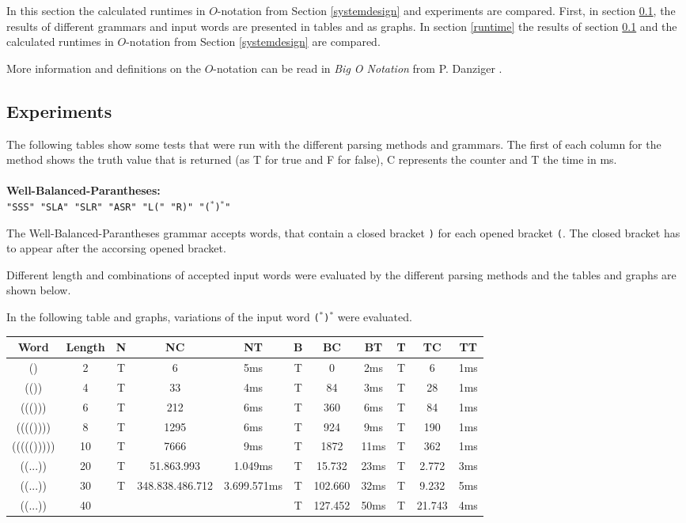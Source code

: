 \documentclass[a4paper, 11pt]{article}
\begin{document}
In this section the calculated runtimes in $O$-notation from Section \ref{systemdesign} and experiments are compared. 
First, in section \ref{experiments}, the results of different grammars and input words are presented in tables and as graphs.
In section \ref{runtime} the results of section \ref{experiments} and the calculated runtimes in $O$-notation from Section \ref{systemdesign} are compared.

More information and definitions on the $O$-notation can be read in \textit{Big O Notation} from P. Danziger \cite{bigO}.


\subsection{Experiments}
\label{experiments}

The following tables show some tests that were run with the different parsing methods and grammars. The first of each column for the method shows the truth value that is returned (as T for true and F for false), C represents the counter and T the time in ms.
\\
\\
\textbf{Well-Balanced-Parantheses:} \\
\texttt{"SSS" "SLA" "SLR" "ASR" "L(" "R)" "($^*$)$^*$"}

The Well-Balanced-Parantheses grammar accepts words, that contain a closed bracket \texttt{)} for each opened bracket \texttt{(}. The closed bracket has to appear after the accorsing opened bracket.

Different length and combinations of accepted input words were evaluated by the different parsing methods and the tables and graphs are shown below.

In the following table and graphs, variations of the input word \texttt{($^*$)$^*$} were evaluated.




\begin{small}
\begin{tabular}{|c|c||c|c|c||c|c|c||c|c|c|}
\hline
Word & Length & N & NC & NT & B & BC & BT & T & TC & TT \\
\hline
\hline
() & 2 & T & 6 & 5ms & T & 0 & 2ms & T & 6 & 1ms \\
\hline
(()) & 4 & T & 33 & 4ms & T & 84 & 3ms & T & 28 & 1ms \\
\hline
((())) & 6 & T & 212 & 6ms & T & 360 & 6ms & T & 84 & 1ms \\
\hline
(((()))) & 8 & T & 1295 & 6ms & T & 924 & 9ms & T & 190 & 1ms \\
\hline
((((())))) & 10 & T & 7666 & 9ms & T & 1872 & 11ms & T & 362 & 1ms \\
\hline
((...)) & 20 & T & 51.863.993 & 1.049ms & T & 15.732 & 23ms & T & 2.772 & 3ms \\
\hline
((...)) & 30 & T & 348.838.486.712 & 3.699.571ms & T & 102.660 & 32ms & T & 9.232 & 5ms \\
\hline
((...)) & 40 & & & & T & 127.452 & 50ms & T & 21.743 & 4ms \\
\hline
\end{tabular}
\end{small}
\end{document}
